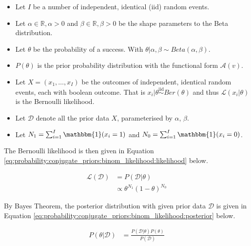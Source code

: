 \begin{itemize}
	\item Let $I$ be a number of independent, identical  (iid) random events.
	
	\item Let $\alpha \in \mathbb{R}, \alpha > 0$ and $\beta \in \mathbb{R}, \beta >0$ be the shape parameters to the Beta distribution.
	
	\item Let $\theta$ be the probability of a success. With $\theta | \alpha, \beta \sim Beta(\alpha, \beta)$.
	
	\item $P(\theta)$ is the prior probability distribution with the functional form $\mathcal{A}(v)$.
	
	\item Let $X = (x_{1}, \dots, x_{I})$ be the outcomes of independent, identical random events, each with boolean outcome. That is $x_{i} | \theta \overset{\text{iid}}{\sim} Ber(\theta)$ and thus $\mathcal{L}(x_{i} \vert \theta)$ is the Bernoulli likelihood.
	
	\item Let $\mathcal{D}$ denote all the prior data $X$, parameterised by $\alpha$, $\beta$.
	
	\item Let $N_{1} = \sum_{i=1}^{I} \mathbbm{1}(x_{i} = 1)$ and $N_{0} = \sum_{i=1}^{I} \mathbbm{1}(x_{i} = 0)$.
\end{itemize}

The Bernoulli likelihood is then given in Equation \ref{eq:probability:conjugate_priors:binom_likelihood:likelihood} below.
	
\begin{equation}
    \label{eq:probability:conjugate_priors:binom_likelihood:likelihood}
    \begin{split}
    	\mathcal{L}(\mathcal{D}) &=  P(\mathcal{D} | \theta) \\
    	&\propto \theta^{N_{1}}(1-\theta)^{N_{0}}
    \end{split}
\end{equation}

By Bayes Theorem, the posterior distribution with given prior data $\mathcal{D}$ is given in Equation \ref{eq:probability:conjugate_priors:binom_likelihood:posterior} below.
	
\begin{equation}
\begin{split}
    \label{eq:probability:conjugate_priors:binom_likelihood:posterior}
	P(\theta \vert \mathcal{D}) &= \frac{P(\mathcal{D} | \theta) P(\theta)}{P(\mathcal{D})}
\end{split}
\end{equation}

